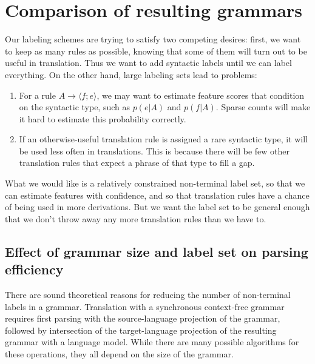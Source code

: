 \documentclass[a4paper]{article}
\begin{document}

\section{Comparison of resulting grammars}
\label{sec:comparison}

Our labeling schemes are trying to satisfy two competing desires: first, we want to keep as many rules as possible, knowing that some of them will turn out to be useful in translation. Thus we want to add syntactic labels until we can label everything. On the other hand, large labeling sets lead to problems:
\begin{enumerate}
\item For a rule $A \to \langle f ; e \rangle$, we may want to estimate feature scores that condition on the syntactic type, such as $p(e|A)$ and $p(f|A)$. Sparse counts will make it hard to estimate this probability correctly.
\item If an otherwise-useful translation rule is assigned a rare syntactic type, it will be used less often in translations. This is because there will be few other translation rules that expect a phrase of that type to fill a gap.
\end{enumerate}
What we would like is a relatively constrained non-terminal label set, so that we can estimate features with confidence, and so that translation rules have a chance of being used in more derivations. But we want the label set to be general enough that we don't throw away any more translation rules than we have to.


\subsection{Effect of grammar size and label set on parsing efficiency}

There are sound theoretical reasons for reducing the number of non-terminal labels in a grammar. Translation with a synchronous context-free grammar requires first parsing with the source-language projection of the grammar, followed by intersection of the target-language projection of the resulting grammar with a language model. While there are many possible algorithms for these operations, they all depend on the size of the grammar.
\end{document}
